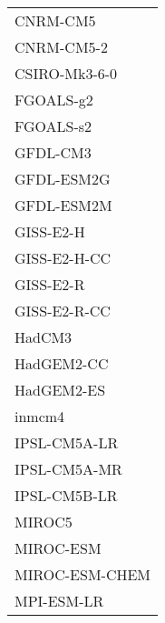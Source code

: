 \documentclass{ametsocV5}
\begin{document}
\begin{table}[t]
\begin{center}
\begin{tabular}{ l }
    CNRM-CM5        \\%
    CNRM-CM5-2      \\%
    CSIRO-Mk3-6-0   \\%
    FGOALS-g2       \\%
    FGOALS-s2       \\%
    GFDL-CM3        \\%
    GFDL-ESM2G      \\%
    GFDL-ESM2M      \\%
    GISS-E2-H       \\%
    GISS-E2-H-CC    \\%
    GISS-E2-R       \\%
    GISS-E2-R-CC    \\%
    HadCM3          \\%
    HadGEM2-CC      \\%
    HadGEM2-ES      \\%
    inmcm4          \\%
    IPSL-CM5A-LR    \\%
    IPSL-CM5A-MR    \\%
    IPSL-CM5B-LR    \\%
    MIROC5          \\%
    MIROC-ESM       \\%
    MIROC-ESM-CHEM  \\%
    MPI-ESM-LR      \\%

\end{tabular}
\end{center}
\end{table}
\end{document}

